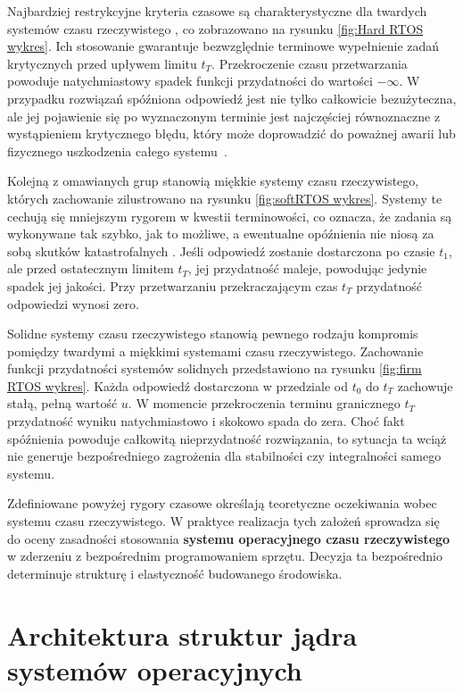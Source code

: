 Najbardziej restrykcyjne kryteria czasowe są charakterystyczne dla twardych systemów czasu rzeczywistego \cite{Tanenbaum}, co zobrazowano na rysunku \ref{fig:Hard RTOS wykres}.
Ich stosowanie gwarantuje bezwzględnie terminowe wypełnienie zadań krytycznych przed upływem limitu $t_T$. Przekroczenie czasu przetwarzania powoduje natychmiastowy spadek funkcji przydatności do wartości $-\infty$.
W przypadku rozwiązań spóźniona odpowiedź jest nie tylko całkowicie bezużyteczna, ale jej pojawienie się po wyznaczonym terminie jest najczęściej równoznaczne z wystąpieniem krytycznego błędu, który może doprowadzić do poważnej awarii lub fizycznego uszkodzenia całego systemu~\cite{Abraham_Silberschatz}.

Kolejną z omawianych grup stanowią miękkie systemy czasu rzeczywistego, których zachowanie zilustrowano na rysunku \ref{fig:softRTOS wykres}. Systemy te cechują się mniejszym rygorem w kwestii terminowości, co oznacza, że zadania są wykonywane tak szybko, 
jak to możliwe, a ewentualne opóźnienia nie niosą za sobą skutków katastrofalnych \cite{Tanenbaum}. Jeśli odpowiedź zostanie dostarczona po czasie $t_1$, ale przed ostatecznym limitem $t_T$, jej przydatność maleje, powodując jedynie spadek jej jakości.
Przy przetwarzaniu przekraczającym czas $t_T$ przydatność odpowiedzi wynosi zero. 

Solidne systemy czasu rzeczywistego stanowią pewnego rodzaju kompromis pomiędzy twardymi a miękkimi systemami czasu rzeczywistego. Zachowanie funkcji przydatności systemów solidnych przedstawiono na rysunku \ref{fig:firm RTOS wykres}. 
Każda odpowiedź dostarczona w przedziale od $t_0$ do $t_T$ zachowuje stałą, pełną wartość $u$. W momencie przekroczenia terminu granicznego $t_T$ przydatność wyniku natychmiastowo i skokowo spada do zera.
Choć fakt spóźnienia powoduje całkowitą nieprzydatność rozwiązania, to sytuacja ta wciąż nie generuje bezpośredniego zagrożenia dla stabilności czy integralności samego systemu. 

Zdefiniowane powyżej rygory czasowe określają teoretyczne oczekiwania wobec systemu czasu rzeczywistego. W praktyce realizacja tych założeń sprowadza się do oceny zasadności stosowania \textbf{systemu operacyjnego czasu rzeczywistego} 
w zderzeniu z bezpośrednim programowaniem sprzętu. Decyzja ta bezpośrednio determinuje strukturę i elastyczność budowanego środowiska.


\section{Architektura struktur jądra systemów operacyjnych}

